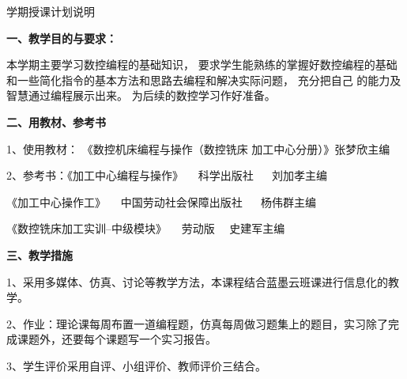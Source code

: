 \documentclass{ctexart}
\begin{document}

\jhsy %

\begin{center}
 \heiti 学期授课计划说明
\end{center}
 \setlength{\parindent}{2em} \setlength{\baselineskip}{22pt}

\textbf{一、教学目的与要求：}

本学期主要学习数控编程的基础知识，
要求学生能熟练的掌握好数控编程的基础和一些简化指令的基本方法和思路去编程和解决实际问题，
充分把自己 的能力及智慧通过编程展示出来。
为后续的数控学习作好准备。

\textbf{二、用教材、参考书}

1、使用教材： 《数控机床编程与操作（数控铣床 加工中心分册）》张梦欣主编

2、参考书：《加工中心编程与操作》~~  科学出版社 ~~ 刘加孝主编

\hspace{5em}《加工中心操作工》~~ 中国劳动社会保障出版社 ~~ 杨伟群主编

\hspace{5em}《数控铣床加工实训--中级模块》 ~~劳动版 ~~史建军主编

\textbf{三、教学措施}

1、采用多媒体、仿真、讨论等教学方法，本课程结合蓝墨云班课进行信息化的教学。

2、作业：理论课每周布置一道编程题，仿真每周做习题集上的题目，实习除了完成课题外，还要每个课题写一个实习报告。

3、学生评价采用自评、小组评价、教师评价三结合。
\end{document}
